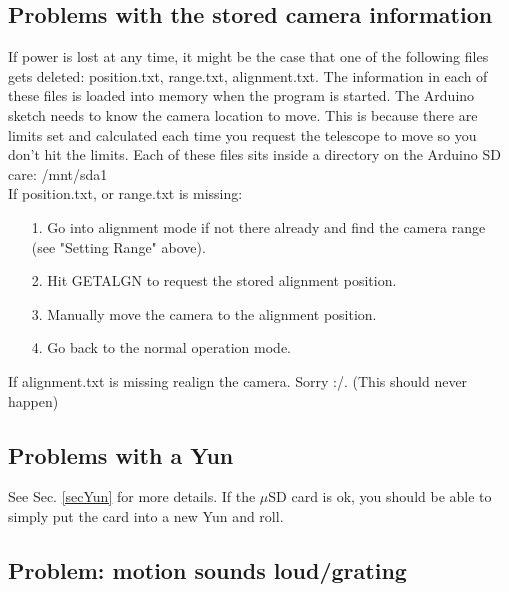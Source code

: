 \documentclass[11pt]{article}
\begin{document}
\subsection{Problems with the stored camera information}

If power is lost at any time, it might be the case that one of the following files gets deleted: position.txt, range.txt, alignment.txt. 
The information in each of these files is loaded into memory when the program is started.
The Arduino sketch needs to know the camera location to move.
This is because there are limits set and calculated each time you request the telescope to move so you don't hit the limits.
Each of these files sits inside a directory on the Arduino SD care: /mnt/sda1\\[15pt]

If position.txt, or range.txt is missing:
\begin{enumerate}
\item[1.] Go into alignment mode if not there already and find the camera range (see "Setting Range" above).
\item[2.] Hit GETALGN to request the stored alignment position.
\item[3.] Manually move the camera to the alignment position.
\item[4.] Go back to the normal operation mode.
\end{enumerate}
If alignment.txt is missing realign the camera. Sorry :/. (This should never happen)

\subsection{Problems with a Yun}
See Sec. \ref{secYun} for more details.
If the $\mu$SD card is ok, you should be able to simply put the card into a new Yun and roll.


\subsection{Problem: motion sounds loud/grating}
\end{document}
